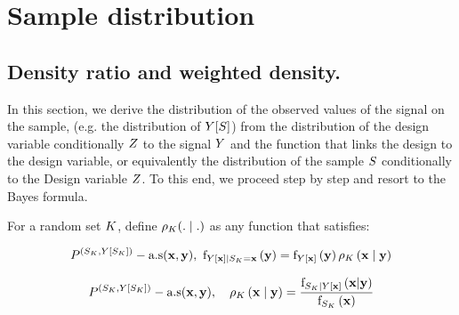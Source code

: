 \section{Sample distribution}\label{sec:sampledistribution}

\subsection{Density ratio and weighted density.}
In this section, we derive the distribution of the observed values of the signal on the sample, (e.g. the distribution of $Y[S]$) from  the distribution of the design variable conditionally $Z$ to the signal $Y$ and the function that links the design to the design variable, or equivalently the distribution of the sample $S$ conditionally to the Design variable $Z$. To this end, we proceed step by step and resort to the Bayes formula. 





\begin{definition}
For a random set $K$, 
define
$\rho_{K}(.\mid.)$ as any function that satisfies:

\begin{equation}
P^{(S_K,Y[S_K])}-\text{a.s}(\mathbf{x},\mathbf{y}),~\mathrm{f}_{Y[\mathbf{x}]\mid S_K=\mathbf{x}}\left(\mathbf{y}\right)=
    \mathrm{f}_{Y[\mathbf{x}]}\left(\mathbf{y}\right)
    \rho_{K}\left(\mathbf{x}\mid  \mathbf{y}\right)\label{eq:owijoj}
\end{equation}

\end{definition}


\begin{property}
\begin{equation}
P^{(S_K,Y[S_K])}-\text{a.s}(\mathbf{x},\mathbf{y}),~~~
\rho_{K}\left(\mathbf{x} \mid \mathbf{y}\right)=
    \frac{\mathrm{f}_{S_K\mid Y[\mathbf{x}]}\left(\mathbf{x}|\mathbf{y}\right)}{
         \mathrm{f}_{S_K}\left(\mathbf{x}\right)}
\end{equation}


\end{property}

